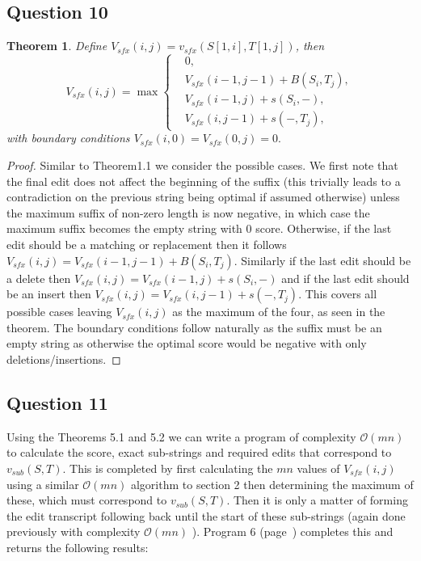\documentclass{article}
\newtheorem{theorem}{Theorem}[section]
\begin{document}
\subsection{Question 10}
\vspace{-0.3cm}
\begin{theorem}
Define $V_{sfx}(i,j) = v_{sfx}(S[1,i],T[1,j])$, then
\begin{equation*}
V_{sfx}(i,j) = \max 
\begin{cases}
&0, \\
&V_{sfx}(i-1,j-1)+B(S_i,T_j), \\
&V_{sfx}(i-1,j)+s(S_i,-), \\
&V_{sfx}(i,j-1)+s(-,T_j),
\end{cases}
\end{equation*}
with boundary conditions $V_{sfx}(i,0)=V_{sfx}(0,j)=0.$
\end{theorem}
\vspace{-0.5cm}
\begin{proof}
Similar to Theorem1.1 we consider the possible cases. We first note that the final edit does not affect the beginning of the suffix (this trivially leads to a contradiction on the previous string being optimal if assumed otherwise) unless the maximum suffix of non-zero length is now negative, in which case the maximum suffix becomes the empty string with 0 score. Otherwise, if the last edit should be a matching or replacement then it follows $V_{sfx}(i,j) = V_{sfx}(i-1,j-1)+B(S_i,T_j)$. Similarly if the last edit should be a delete then $V_{sfx}(i,j) = V_{sfx}(i-1,j)+s(S_i,-)$ and if the last edit should be an insert then $V_{sfx}(i,j) =V_{sfx}(i,j-1)+s(-,T_j)$. This covers all possible cases leaving $V_{sfx}(i,j) $ as the maximum of the four, as seen in the theorem. The boundary conditions follow naturally as the suffix must be an empty string as otherwise the optimal score would be negative with only deletions/insertions.
\end{proof}
\vspace{-0.5cm}

\subsection{Question 11}
\vspace{-0.3cm}
Using the Theorems 5.1 and 5.2 we can write a program of complexity $\mathcal{O}(mn)$ to calculate the score, exact sub-strings and required edits that correspond to $v_{sub}(S,T)$. This is completed by first calculating the $mn$ values of $V_{sfx}(i,j)$ using a similar $\mathcal{O}(mn)$ algorithm to section 2 then determining the maximum of these, which must correspond to $v_{sub}(S,T)$. Then it is only a matter of forming the edit transcript following back until the start of these sub-strings (again done previously with complexity $\mathcal{O}(mn)$ ). Program 6 (page~\pageref{subsec:Program 6}) completes this and returns the following results:
\end{document}
